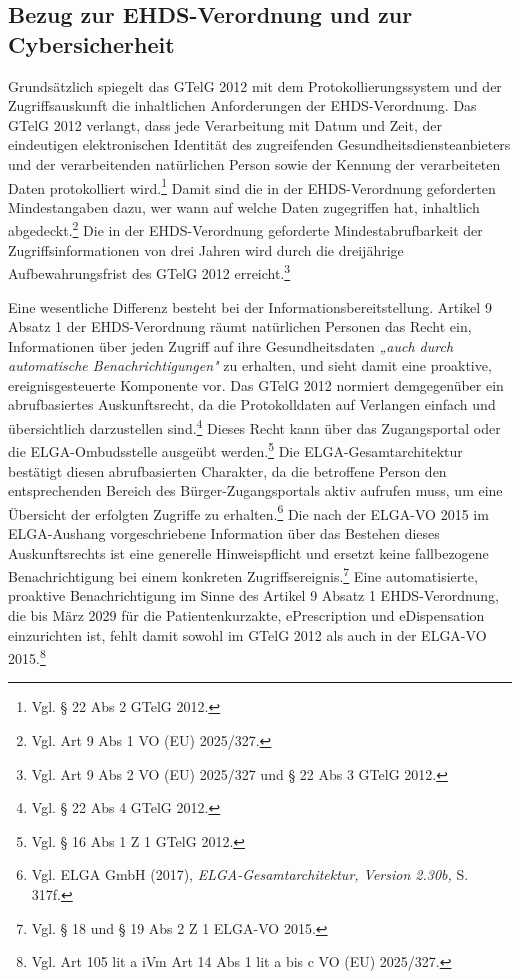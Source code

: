     \subsection{Bezug zur EHDS-Verordnung und zur Cybersicherheit}
 Grundsätzlich spiegelt das GTelG 2012 mit dem Protokollierungssystem und der Zugriffsauskunft die inhaltlichen Anforderungen der EHDS-Verordnung. Das GTelG 2012 verlangt, dass jede Verarbeitung mit Datum und Zeit, der eindeutigen elektronischen Identität des zugreifenden Gesundheitsdiensteanbieters und der verarbeitenden natürlichen Person sowie der Kennung der verarbeiteten Daten protokolliert wird.\footnote{Vgl. § 22 Abs 2 GTelG 2012.} Damit sind die in der EHDS-Verordnung geforderten Mindestangaben dazu, wer wann auf welche Daten zugegriffen hat, inhaltlich abgedeckt.\footnote{Vgl. Art 9 Abs 1 VO (EU) 2025/327.} Die in der EHDS-Verordnung geforderte Mindestabrufbarkeit der Zugriffsinformationen von drei Jahren wird durch die dreijährige Aufbewahrungsfrist des GTelG 2012 erreicht.\footnote{Vgl. Art 9 Abs 2 VO (EU) 2025/327 und § 22 Abs 3 GTelG 2012.}

Eine wesentliche Differenz besteht bei der Informationsbereitstellung. Artikel 9 Absatz 1 der EHDS-Verordnung räumt natürlichen Personen das Recht ein, Informationen über jeden Zugriff auf ihre Gesundheitsdaten \textit{„auch durch automatische Benachrichtigungen"} zu erhalten, und sieht damit eine proaktive, ereignisgesteuerte Komponente vor. Das GTelG 2012 normiert demgegenüber ein abrufbasiertes Auskunftsrecht, da die Protokolldaten auf Verlangen einfach und übersichtlich darzustellen sind.\footnote{Vgl. § 22 Abs 4 GTelG 2012.} Dieses Recht kann über das Zugangsportal oder die ELGA-Ombudsstelle ausgeübt werden.\footnote{Vgl. § 16 Abs 1 Z 1 GTelG 2012.} Die ELGA-Gesamtarchitektur bestätigt diesen abrufbasierten Charakter, da die betroffene Person den entsprechenden Bereich des Bürger-Zugangsportals aktiv aufrufen muss, um eine Übersicht der erfolgten Zugriffe zu erhalten.\footnote{Vgl.  ELGA GmbH (2017), \textit{ELGA-Gesamtarchitektur, Version 2.30b,} S. 317f.} Die nach der ELGA-VO 2015 im ELGA-Aushang vorgeschriebene Information über das Bestehen dieses Auskunftsrechts ist eine generelle Hinweispflicht und ersetzt keine fallbezogene Benachrichtigung bei einem konkreten Zugriffsereignis.\footnote{Vgl. § 18 und § 19 Abs 2 Z 1 ELGA-VO 2015.} Eine automatisierte, proaktive Benachrichtigung im Sinne des Artikel 9 Absatz 1 EHDS-Verordnung, die bis März 2029 für die Patientenkurzakte, ePrescription und eDispensation einzurichten ist, fehlt damit sowohl im GTelG 2012 als auch in der ELGA-VO 2015.\footnote{Vgl. Art 105 lit a iVm Art 14 Abs 1 lit a bis c  VO (EU) 2025/327.}

